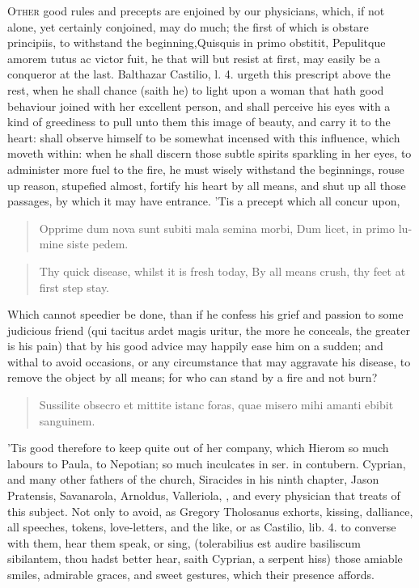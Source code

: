 \lettrine{O}{ther} good rules and precepts are enjoined by our physicians, which, if
not alone, yet certainly conjoined, may do much; the first of which is
obstare principiis, to withstand the beginning,Quisquis in primo
obstitit, Pepulitque amorem tutus ac victor fuit, he that will but
resist at first, may easily be a conqueror at the last. Balthazar
Castilio, l. 4. urgeth this prescript above the rest, when he
shall chance (saith he) to light upon a woman that hath good behaviour
joined with her excellent person, and shall perceive his eyes with a
kind of greediness to pull unto them this image of beauty, and carry it
to the heart: shall observe himself to be somewhat incensed with this
influence, which moveth within: when he shall discern those subtle
spirits sparkling in her eyes, to administer more fuel to the fire, he
must wisely withstand the beginnings, rouse up reason, stupefied
almost, fortify his heart by all means, and shut up all those passages,
by which it may have entrance. 'Tis a precept which all concur upon,

\begin{latin}
\begin{verse}
Opprime dum nova sunt subiti mala semina morbi,
Dum licet, in primo lumine siste pedem.
\end{verse}
\end{latin}
\translationrule%
\begin{verse}%
Thy quick disease, whilst it is fresh today,
By all means crush, thy feet at first step stay.
\end{verse}%

Which cannot speedier be done, than if he confess his grief and passion
to some judicious friend (qui tacitus ardet magis uritur, the
more he conceals, the greater is his pain) that by his good advice may
happily ease him on a sudden; and withal to avoid occasions, or any
circumstance that may aggravate his disease, to remove the object by
all means; for who can stand by a fire and not burn?

\begin{latin}
\begin{verse}
Sussilite obsecro et mittite istanc foras,
quae misero mihi amanti ebibit sanguinem.
\end{verse}
\end{latin}

'Tis good therefore to keep quite out of her company, which Hierom so
much labours to Paula, to Nepotian; \Chrysostom{} so much inculcates in
ser. in contubern. Cyprian, and many other fathers of the church,
Siracides in his ninth chapter, Jason Pratensis, Savanarola, Arnoldus,
Valleriola, \etc{}, and every physician that treats of this subject. Not
only to avoid, as  Gregory Tholosanus exhorts, kissing,
dalliance, all speeches, tokens, love-letters, and the like, or as
Castilio, lib. 4. to converse with them, hear them speak, or sing,
(tolerabilius est audire basiliscum sibilantem, thou hadst better hear,
saith Cyprian, a serpent hiss) those amiable smiles,
admirable graces, and sweet gestures, which their presence affords.

